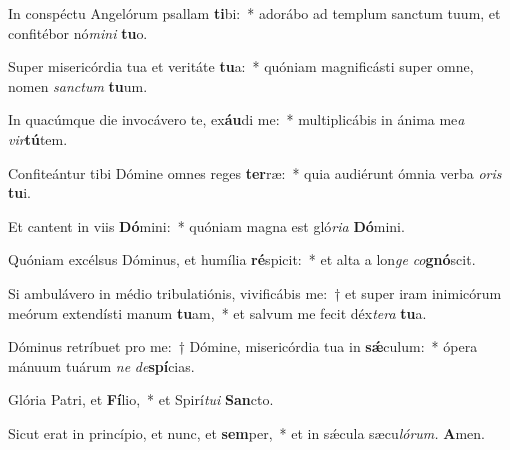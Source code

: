 \item In conspéctu Angelórum psallam \textbf{ti}bi:~* adorábo ad templum sanctum tuum, et confitébor nó\textit{mini} \textbf{tu}o.
\item Super misericórdia tua et veritáte \textbf{tu}a:~* quóniam magnificásti super omne, nomen \textit{sanctum} \textbf{tu}um.
\item In quacúmque die invocávero te, ex\textbf{áu}di me:~* multiplicábis in ánima me\tinyhspace\textit{a} \textit{vir}\textbf{tú}tem.
\item Confiteántur tibi Dómine omnes reges \textbf{ter}ræ:~* quia audiérunt ómnia verba \textit{oris} \textbf{tu}i.
\item Et cantent in viis \textbf{Dó}mini:~* quóniam magna est gló\textit{ria} \textbf{Dó}mini.
\item Quóniam excélsus Dóminus, et humília \textbf{ré}spicit:~* et alta a lon\textit{ge} \textit{co}\textbf{gnó}scit.
\item Si ambulávero in médio tribulatiónis, vivificábis me:~† et super iram inimicórum meórum extendísti manum \textbf{tu}am,~* et salvum me fecit déx\hspace*{0.01em}\textit{tera} \textbf{tu}a.
\item Dóminus retríbuet pro me:~† Dómine, misericórdia tua in \textbf{sǽ}culum:~* ópera mánuum tuárum \textit{ne} \textit{de}\textbf{spí}cias.
\item Glória Patri, et \textbf{Fí}lio,~* et Spirí\tinyhspace\textit{tui} \textbf{San}cto.
\item Sicut erat in princípio, et nunc, et \textbf{sem}per,~* et in sǽcula sæcu\tinyhspace\textit{lórum.} \textbf{A}men.